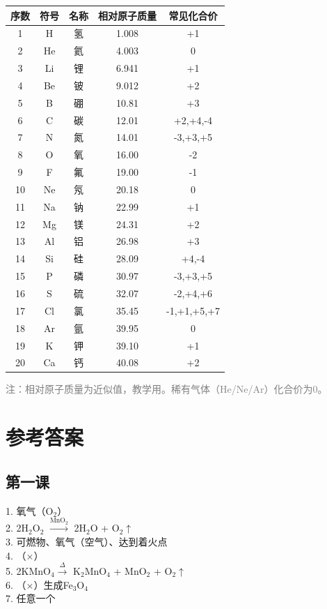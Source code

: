 \documentclass[a4paper,12pt]{ctexart}
\begin{document}
\begin{center}
\begin{tabular}{|c|c|c|c|c|}
\hline
\textbf{序数} & \textbf{符号} & \textbf{名称} & \textbf{相对原子质量} & \textbf{常见化合价} \\
\hline
1 & H & 氢 & 1.008 & +1 \\
2 & He & 氦 & 4.003 & 0 \\
3 & Li & 锂 & 6.941 & +1 \\
4 & Be & 铍 & 9.012 & +2 \\
5 & B & 硼 & 10.81 & +3 \\
6 & C & 碳 & 12.01 & +2,+4,-4 \\
7 & N & 氮 & 14.01 & -3,+3,+5 \\
8 & O & 氧 & 16.00 & -2 \\
9 & F & 氟 & 19.00 & -1 \\
10 & Ne & 氖 & 20.18 & 0 \\
11 & Na & 钠 & 22.99 & +1 \\
12 & Mg & 镁 & 24.31 & +2 \\
13 & Al & 铝 & 26.98 & +3 \\
14 & Si & 硅 & 28.09 & +4,-4 \\
15 & P & 磷 & 30.97 & -3,+3,+5 \\
16 & S & 硫 & 32.07 & -2,+4,+6 \\
17 & Cl & 氯 & 35.45 & -1,+1,+5,+7 \\
18 & Ar & 氩 & 39.95 & 0 \\
19 & K & 钾 & 39.10 & +1 \\
20 & Ca & 钙 & 40.08 & +2 \\
\hline
\end{tabular}
\end{center}

\vspace{0.3cm}
\textcolor{gray}{\small 注：相对原子质量为近似值，教学用。稀有气体（He/Ne/Ar）化合价为0。}

\newpage
\section*{\textcolor{defblue}{参考答案}}

\subsection*{第一课}
1. 氧气（O$_2$）\\
2. 2H$_2$O$_2$ $\xrightarrow{\text{MnO}_2}$ 2H$_2$O + O$_2$$\uparrow$\\
3. 可燃物、氧气（空气）、达到着火点\\
4. （×）\\
5. 2KMnO$_4 \xrightarrow{\Delta}$ K$_2$MnO$_4$ + MnO$_2$ + O$_2$$\uparrow$\\
6. （×）生成Fe$_3$O$_4$\\
7. 任意一个
\end{document}
